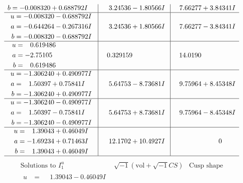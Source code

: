 \documentclass[1p]{elsarticle_modified}
\theoremstyle{definition}
\newcommand{\I}{\sqrt{-1}}
\begin{document}
$$\begin{array}{c|c|c}
\begin{aligned}
b &= -0.008320 + 0.688792 I\end{aligned}
 & \phantom{-}3.24536 - 1.80566 I & \phantom{-}7.66277 + 3.84341 I \\ \hline\begin{aligned}
u &= -0.008320 - 0.688792 I \\
a &= -0.644264 - 0.267316 I \\
b &= -0.008320 - 0.688792 I\end{aligned}
 & \phantom{-}3.24536 + 1.80566 I & \phantom{-}7.66277 - 3.84341 I \\ \hline\begin{aligned}
u &= \phantom{-}0.619486\phantom{ +0.000000I} \\
a &= -2.75105\phantom{ +0.000000I} \\
b &= \phantom{-}0.619486\phantom{ +0.000000I}\end{aligned}
 & \phantom{-}0.329159\phantom{ +0.000000I} & \phantom{-}14.0190\phantom{ +0.000000I} \\ \hline\begin{aligned}
u &= -1.306240 + 0.490977 I \\
a &= \phantom{-}1.50397 + 0.75841 I \\
b &= -1.306240 + 0.490977 I\end{aligned}
 & \phantom{-}5.64753 - 8.73681 I & \phantom{-}9.75964 + 8.45348 I \\ \hline\begin{aligned}
u &= -1.306240 - 0.490977 I \\
a &= \phantom{-}1.50397 - 0.75841 I \\
b &= -1.306240 - 0.490977 I\end{aligned}
 & \phantom{-}5.64753 + 8.73681 I & \phantom{-}9.75964 - 8.45348 I \\ \hline\begin{aligned}
u &= \phantom{-}1.39043 + 0.46049 I \\
a &= -1.69234 + 0.71463 I \\
b &= \phantom{-}1.39043 + 0.46049 I\end{aligned}
 & \phantom{-}12.1702 + 10.4927 I & \phantom{-0.000000 } 0\\
 \hline 
 \end{array}$$\newpage$$\begin{array}{c|c|c}  
\text{Solutions to }I^u_{1}& \I (\text{vol} + \sqrt{-1}CS) & \text{Cusp shape}\\
 \hline 
\begin{aligned}
u &= \phantom{-}1.39043 - 0.46049 I \\

\end{aligned}
\end{array}$$
\end{document}
